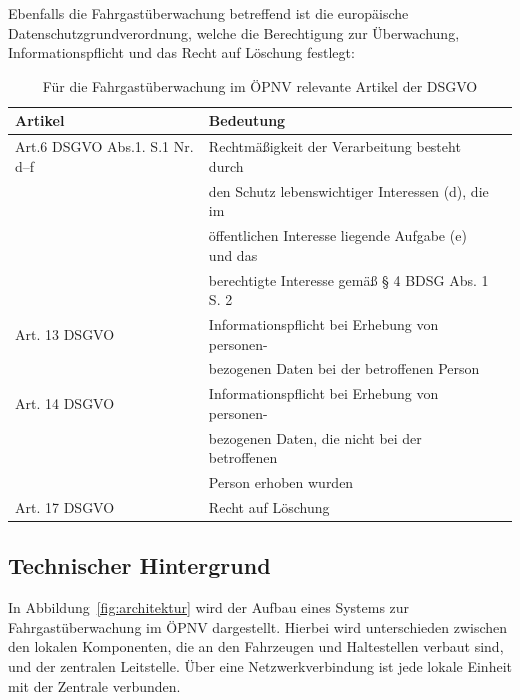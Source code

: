 Ebenfalls die Fahrgastüberwachung betreffend ist die europäische Datenschutzgrundverordnung, welche die Berechtigung zur Überwachung, Informationspflicht und das Recht auf Löschung festlegt:
\begin{table}
    \caption{Für die Fahrgastüberwachung im ÖPNV relevante Artikel der DSGVO \cite{EuropaischeUnion.}}\label{tab:dsgvo}
    \begin{tabular}{|l|l|l|}
        \hline
        Artikel                         & Bedeutung                                           \\
        \hline
        Art.6 DSGVO Abs.1. S.1 Nr. d--f & Rechtmäßigkeit der Verarbeitung besteht durch       \\
                                        & den Schutz lebenswichtiger Interessen (d), die im   \\
                                        & öffentlichen Interesse liegende Aufgabe (e) und das \\
                                        & berechtigte Interesse gemäß § 4 BDSG  Abs. 1 S. 2   \\ [1ex]
        Art. 13 DSGVO                   & Informationspflicht bei Erhebung von personen-      \\
                                        & bezogenen Daten bei der betroffenen Person          \\ [1ex]
        Art. 14 DSGVO                   & Informationspflicht bei Erhebung von personen-      \\
                                        & bezogenen Daten, die nicht bei der betroffenen      \\
                                        & Person erhoben wurden                               \\ [1ex]
        Art. 17 DSGVO                   & Recht auf Löschung                                  \\
        \hline
    \end{tabular}
\end{table}


\subsection{Technischer Hintergrund}
\label{abschnitt:technisch}
In Abbildung~\ref{fig:architektur} wird der Aufbau eines Systems zur Fahrgastüberwachung im ÖPNV dargestellt. Hierbei wird unterschieden zwischen den lokalen Komponenten, die an den Fahrzeugen und Haltestellen
verbaut sind, und der zentralen Leitstelle. Über eine Netzwerkverbindung ist jede lokale Einheit mit der Zentrale verbunden.

